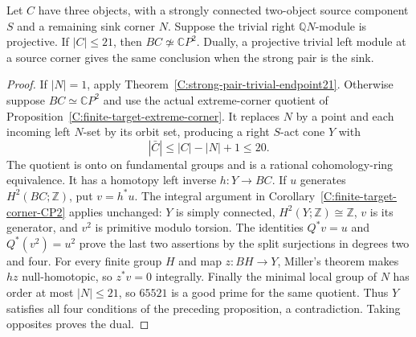 \begin{corollary}\label{C:strong-pair-projective-endpoint21}
Let $C$ have three objects, with a strongly connected two-object
source component $S$ and a remaining sink corner $N$. Suppose
the trivial right $\mathbb QN$-module is projective.
If $|C|\leq21$, then $BC\not\simeq\mathbb CP^2$.
Dually, a projective trivial left module at a source corner
gives the same conclusion when the strong pair is the sink.
\end{corollary}
\begin{proof}
If $|N|=1$, apply
Theorem~\ref{C:strong-pair-trivial-endpoint21}.
Otherwise suppose $BC\simeq\mathbb CP^2$ and use the actual
extreme-corner quotient of
Proposition~\ref{C:finite-target-extreme-corner}.
It replaces $N$ by a point and each incoming left $N$-set by
its orbit set, producing a right $S$-act cone $Y$ with
\[
 |\bar C|\leq |C|-|N|+1\leq20.
\]
The quotient is onto on fundamental groups and is a rational
cohomology-ring equivalence. It has a homotopy left inverse
$h:Y\to BC$. If $u$ generates $H^2(BC;\mathbb Z)$, put
$v=h^*u$. The integral argument in
Corollary~\ref{C:finite-target-corner-CP2} applies unchanged:
$Y$ is simply connected, $H^2(Y;\mathbb Z)\cong\mathbb Z$,
$v$ is its generator, and $v^2$ is primitive modulo torsion.
The identities $Q^*v=u$ and $Q^*(v^2)=u^2$ prove the last
two assertions by the split surjections in degrees two and four.
For every finite group $H$ and map $z:BH\to Y$, Miller's
theorem makes $hz$ null-homotopic, so $z^*v=0$ integrally.
Finally the minimal local group of $N$ has order at most
$|N|\leq21$, so $65521$ is a good prime for the same quotient.
Thus $Y$ satisfies all four conditions of the preceding
proposition, a contradiction. Taking opposites proves the dual.
\end{proof}

